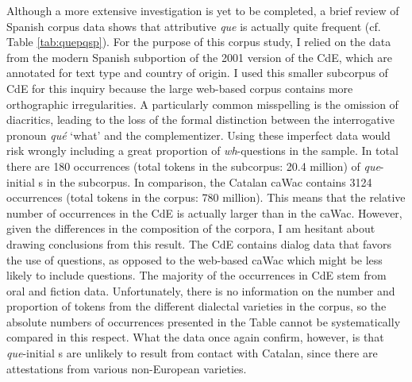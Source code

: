 Although a more extensive investigation is yet to be completed, a brief review of Spanish corpus data shows that attributive \emph{que}  is actually quite frequent (cf. Table \ref{tab:quepqsp}). For the purpose of this corpus study, I relied on the data from the modern Spanish subportion of the 2001 version of the CdE, which are annotated for text type and country of origin. I used this smaller subcorpus of CdE for this inquiry because the large web-based corpus contains more orthographic irregularities. A particularly common misspelling is the omission of  diacritics, leading to the loss of the formal distinction between the interrogative pronoun \emph{qué} `what' and the complementizer. Using these imperfect data  would  risk  wrongly including a great proportion of \textit{wh}-questions in the sample. In total there are 180 occurrences (total tokens in the subcorpus: 20.4 million) of \emph{que}-initial s in the subcorpus. In comparison, the Catalan caWac contains 3124 occurrences (total tokens in the corpus: 780 million). This means that the relative number of occurrences in the CdE is actually larger than in the caWac. However, given the differences in the composition of the corpora, I am hesitant about  drawing  conclusions from this result. The CdE contains dialog data that favors the use of questions, as opposed to the  web-based caWac which might be less likely to include questions. The majority of the occurrences in CdE stem from oral and fiction data. Unfortunately, there is no information on the number and proportion of tokens from the different dialectal varieties in the corpus, so the absolute numbers of occurrences  presented in the Table cannot be  systematically compared in this respect. What the data  once again confirm, however, is that \emph{que}-initial s are unlikely to result from contact with Catalan, since there are attestations from various non-European varieties.

